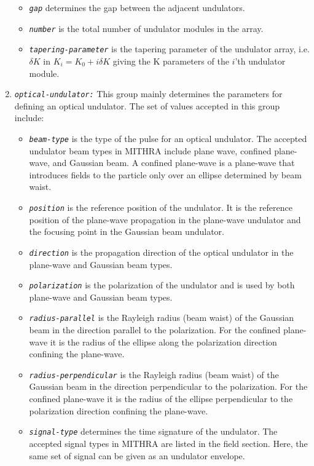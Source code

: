 \begin{enumerate}
\begin{itemize}
	\item {\tt \small \em gap} determines the gap between the adjacent undulators.
    \item {\tt \small \em number} is the total number of undulator modules in the array.
    \item {\tt \small \em tapering-parameter} is the tapering parameter of the undulator array, i.e. $\delta K$ in $K_i=K_0+i \delta K$ giving the K parameters of the $i$'th undulator module. 
\end{itemize}
%
\item {\tt \small \em optical-undulator:} This group mainly determines the parameters for defining an optical undulator. The set of values accepted in this group include:
%
\begin{itemize}
	\item {\tt \small \em beam-type} is the type of the pulse for an optical undulator. The accepted undulator beam types in MITHRA include plane wave, confined plane-wave, and Gaussian beam. A confined plane-wave is a plane-wave that introduces fields to the particle only over an ellipse determined by beam waist.
	\item {\tt \small \em position} is the reference position of the undulator. It is the reference position of the plane-wave propagation in the plane-wave undulator and the focusing point in the Gaussian beam undulator.
	\item {\tt \small \em direction} is the propagation direction of the optical undulator in the plane-wave and Gaussian beam types.
	\item {\tt \small \em polarization} is the polarization of the undulator and is used by both plane-wave and Gaussian beam types.
	\item {\tt \small \em radius-parallel} is the Rayleigh radius (beam waist) of the Gaussian beam in the direction parallel to the polarization. For the confined plane-wave it is the radius of the ellipse along the polarization direction confining the plane-wave.
	\item {\tt \small \em radius-perpendicular} is the Rayleigh radius (beam waist) of the Gaussian beam in the direction perpendicular to the polarization. For the confined plane-wave it is the radius of the ellipse perpendicular to the polarization direction confining the plane-wave.
	\item {\tt \small \em signal-type} determines the time signature of the undulator. The accepted signal types in MITHRA are listed in the field section. Here, the same set of signal can be given as an undulator envelope.

\end{itemize}
\end{enumerate}
